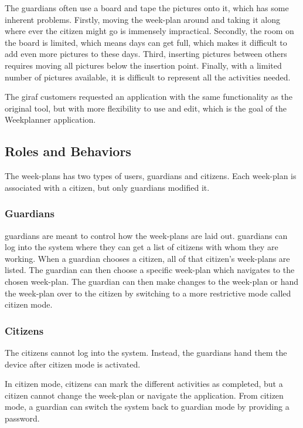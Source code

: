 The \glspl{guardian} often use a board and tape the pictures onto it, which has some inherent problems. Firstly, moving the week-plan around and taking it along where ever the \gls{citizen} might go is immensely impractical. Secondly, the room on the board is limited, which means days can get full, which makes it difficult to add even more pictures to these days. Third, inserting pictures between others requires moving all pictures below the insertion point. Finally, with a limited number of pictures available, it is difficult to represent all the activities needed.  

The \gls{giraf} customers requested an application with the same functionality as the original tool, but with more flexibility to use and edit, which is the goal of the Weekplanner application. 

\subsection{Roles and Behaviors}

The week-plans has two types of users, \glspl{guardian} and \glspl{citizen}. Each week-plan is associated with a \gls{citizen}, but only \glspl{guardian}  modified it.

\subsubsection{Guardians}

\Glspl{guardian} are meant to control how the week-plans are laid out. \Glspl{guardian} can log into the system where they can get a list of \glspl{citizen} with whom they are working. When a \gls{guardian} chooses a \gls{citizen}, all of that \gls{citizen}'s week-plans are listed. The \gls{guardian} can then choose a specific week-plan which navigates to the chosen week-plan. The \gls{guardian} can then make changes to the week-plan or hand the week-plan over to the \gls{citizen} by switching to a more restrictive mode called \gls{citizen} mode.

\subsubsection{Citizens}

The \glspl{citizen} cannot log into the system. Instead, the \glspl{guardian} hand them the device after citizen mode is activated.

In citizen mode, \glspl{citizen} can mark the different activities as completed, but a citizen cannot change the week-plan or navigate the application. From citizen mode, a \gls{guardian} can switch the system back to guardian mode by providing a password.

